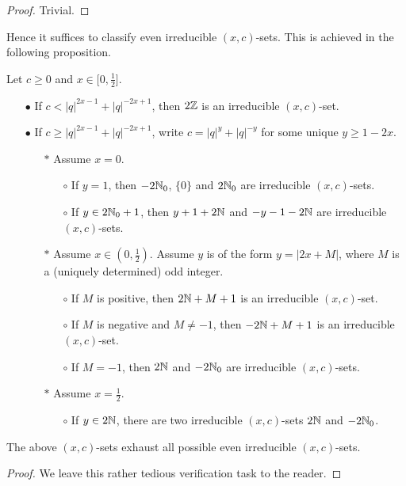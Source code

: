 \begin{proof} Trivial.
\end{proof}

Hence it suffices to classify even irreducible $(x,c)$-sets. This is achieved in the following proposition.

\begin{Prop}\label{PropClass1D} Let $c\geq 0$ and $x\in \lbrack 0,\frac{1}{2}\rbrack$.  
\begin{itemize}
\item[$\bullet$] If $c< |q|^{2x-1}+|q|^{-2x+1}$, then $2\mathbb{Z}$ is an irreducible $(x,c)$-set.
\item[$\bullet$] If $c\geq |q|^{2x-1}+|q|^{-2x+1}$, write $c=|q|^y+|q|^{-y}$ for some unique $y\geq 1-2x$. 
\begin{itemize}\item[$*$] Assume $x=0$.
\begin{itemize}\item[$\circ$] If $y=1$, then $-2\mathbb{N}_0$, $\{0\}$ and $2\mathbb{N}_0$ are irreducible $(x,c)$-sets.
\item[$\circ$] If $y\in 2\mathbb{N}_0+1$, then $y+1+2\mathbb{N}$ and $-y-1-2\mathbb{N}$ are irreducible $(x,c)$-sets.
\end{itemize}
\item[$*$] Assume $x\in (0,\frac{1}{2})$. Assume $y$ is of the form $y=|2x+M|$, where $M$ is a (uniquely determined) odd integer. 
\begin{itemize}\item[$\circ$] If $M$ is positive, then $2\mathbb{N}+M+1$ is an irreducible $(x,c)$-set. 
\item[$\circ$] If $M$ is negative and $M\neq -1$, then $-2\mathbb{N}+M+1$ is an irreducible $(x,c)$-set. 
\item[$\circ$] If $M=-1$, then $2\mathbb{N}$ and $-2\mathbb{N}_0$ are irreducible $(x,c)$-sets.
\end{itemize}
\item[$*$] Assume $x=\frac{1}{2}$.
\begin{itemize}\item[$\circ$] If $y\in 2\mathbb{N}$, there are two irreducible $(x,c)$-sets $2\mathbb{N}$ and $-2\mathbb{N}_0$.
\end{itemize}
\end{itemize}
\end{itemize}
The above $(x,c)$-sets exhaust all possible even irreducible $(x,c)$-sets.
\end{Prop} 
\begin{proof}
We leave this rather tedious verification task to the reader.
\end{proof} 

